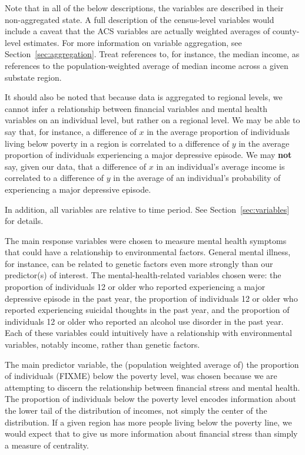 \documentclass{article}
\begin{document}
Note that in all of the below descriptions, the variables are described in their
non-aggregated state. A full description of the census-level variables would
include a caveat that the ACS variables are actually weighted averages of
county-level estimates. For more information on variable aggregation, see
Section~\ref{sec:aggregation}. Treat references to, for instance, the
median income, as references to the population-weighted average of
median income across a given substate region.

It should also be noted that because data is aggregated to regional levels, we
cannot infer a relationship between financial variables and mental health
variables on an individual level, but rather on a regional level. We may be
able to say that, for instance, a difference of $x$ in the average proportion
of individuals living below poverty in a region is correlated to a difference
of $y$ in the average proportion of individuals experiencing a major depressive
episode. We may \textbf{not} say, given our data, that a difference of $x$ in
an individual's average income is correlated to a difference of $y$ in the
average of an individual's probability of experiencing a major depressive
episode.

In addition, all variables are relative to time period.
See Section~\ref{sec:variables} for details.

The main response variables were chosen to measure mental health
symptoms that could have a relationship to environmental factors.
General mental illness, for instance, can be related to genetic factors
even more strongly than our predictor(s) of interest. The
mental-health-related variables chosen were: the proportion of individuals 12
or older who reported experiencing a major depressive episode in the
past year, the proportion of individuals 12 or older who reported
experiencing suicidal thoughts in the past year, and the proportion of
individuals 12 or older who reported an alcohol use disorder in the past
year. Each of these variables could intuitively have a relationship with
environmental variables, notably income, rather than genetic factors.

The main predictor variable, the (population weighted average of) the
proportion of individuals (FIXME) below the poverty level, was chosen
because we are attempting to discern the relationship between financial
stress and mental health. The proportion of individuals below the
poverty level encodes information about the lower tail of the
distribution of incomes, not simply the center of the distribution.
If a given region has more people living below the poverty line, we
would expect that to give us more information about financial stress
than simply a measure of centrality.
\end{document}
